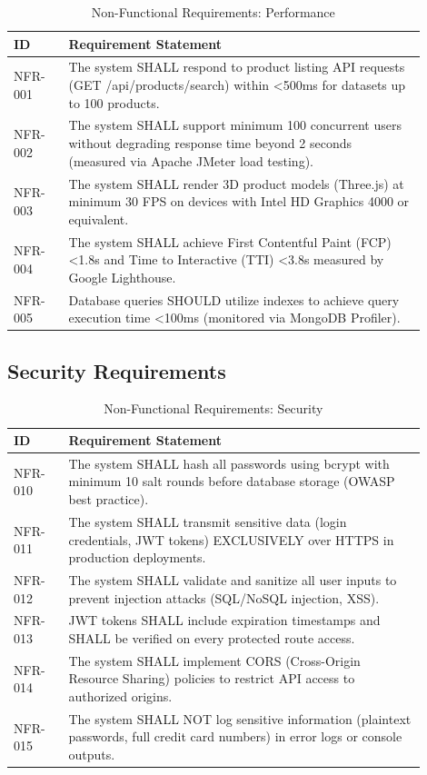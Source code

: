 \begin{table}[H]
\centering
\caption{Non-Functional Requirements: Performance}
\label{tab:nfr_performance}
\small
\begin{tabular}{@{}p{0.12\linewidth}p{0.78\linewidth}@{}}
\toprule
\textbf{ID} & \textbf{Requirement Statement} \\
\midrule
NFR-001 & The system SHALL respond to product listing API requests (GET /api/products/search) within \textless 500ms for datasets up to 100 products. \\
NFR-002 & The system SHALL support minimum 100 concurrent users without degrading response time beyond 2 seconds (measured via Apache JMeter load testing). \\
NFR-003 & The system SHALL render 3D product models (Three.js) at minimum 30 FPS on devices with Intel HD Graphics 4000 or equivalent. \\
NFR-004 & The system SHALL achieve First Contentful Paint (FCP) \textless 1.8s and Time to Interactive (TTI) \textless 3.8s measured by Google Lighthouse. \\
NFR-005 & Database queries SHOULD utilize indexes to achieve query execution time \textless 100ms (monitored via MongoDB Profiler). \\
\bottomrule
\end{tabular}
\end{table}

\subsection{Security Requirements}

\begin{table}[H]
\centering
\caption{Non-Functional Requirements: Security}
\label{tab:nfr_security}
\small
\begin{tabular}{@{}p{0.12\linewidth}p{0.78\linewidth}@{}}
\toprule
\textbf{ID} & \textbf{Requirement Statement} \\
\midrule
NFR-010 & The system SHALL hash all passwords using bcrypt with minimum 10 salt rounds before database storage (OWASP best practice). \\
NFR-011 & The system SHALL transmit sensitive data (login credentials, JWT tokens) EXCLUSIVELY over HTTPS in production deployments. \\
NFR-012 & The system SHALL validate and sanitize all user inputs to prevent injection attacks (SQL/NoSQL injection, XSS). \\
NFR-013 & JWT tokens SHALL include expiration timestamps and SHALL be verified on every protected route access. \\
NFR-014 & The system SHALL implement CORS (Cross-Origin Resource Sharing) policies to restrict API access to authorized origins. \\
NFR-015 & The system SHALL NOT log sensitive information (plaintext passwords, full credit card numbers) in error logs or console outputs. \\
\bottomrule
\end{tabular}
\end{table}

